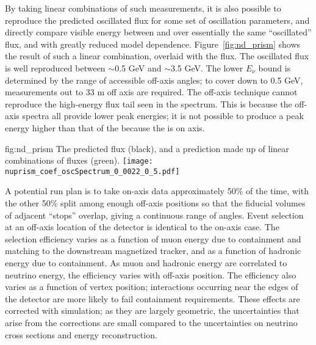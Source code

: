 By taking linear combinations of such measurements, it is also possible to reproduce the predicted  oscillated flux for some set of oscillation parameters, and directly compare visible energy between  and  over essentially the same ``oscillated'' flux, and with greatly reduced model dependence. Figure~\ref{fig:nd_prism} shows the result of such a linear combination, overlaid with the  flux. The oscillated flux is well reproduced between $\sim$0.5 GeV and $\sim$3.5 GeV. The lower $E_{\nu}$ bound is determined by the range of accessible off-axis angles; to cover down to 0.5 GeV, measurements out to 33 m off axis are required. The off-axis technique cannot reproduce the high-energy flux tail seen in the  spectrum. This is because the off-axis spectra all provide lower peak energies; it is not possible to produce a peak energy higher than that of the  because the  is on axis.

\begin{dunefigure}{fig:nd_prism}
{The predicted  flux (black), and a prediction made up of linear combinations of  fluxes (green).}
 \texttt{[image: nuprism\_coef\_oscSpectrum\_0\_0022\_0\_5.pdf]}
\end{dunefigure}

A potential run plan is to take on-axis data approximately 50\% of the time, with the other 50\% split among enough off-axis positions so that the fiducial volumes of adjacent ``stops'' overlap, giving a continuous range of angles. Event selection at an off-axis location of the  detector is identical to the on-axis case. The selection efficiency varies as a function of muon energy due to containment and matching to the downstream magnetized tracker, and as a function of hadronic energy due to containment. As muon and hadronic energy are correlated to neutrino energy, the efficiency varies with off-axis position. The efficiency also varies as a function of vertex position; interactions occurring near the edges of the detector are more likely to fail containment requirements. These effects are corrected with simulation; as they are largely geometric, the uncertainties that arise from the corrections are small compared to the uncertainties on neutrino cross sections and energy reconstruction. %

